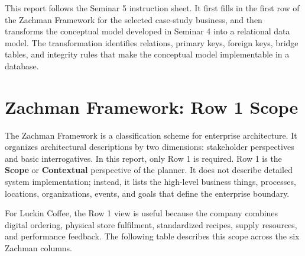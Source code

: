 \documentclass[12pt,a4paper]{article}
\begin{document}
This report follows the Seminar 5 instruction sheet. It first fills in the first row of the Zachman Framework for the selected case-study business, and then transforms the conceptual model developed in Seminar 4 into a relational data model. The transformation identifies relations, primary keys, foreign keys, bridge tables, and integrity rules that make the conceptual model implementable in a database.

\section{Zachman Framework: Row 1 Scope}

The Zachman Framework is a classification scheme for enterprise architecture. It organizes architectural descriptions by two dimensions: stakeholder perspectives and basic interrogatives. In this report, only Row 1 is required. Row 1 is the \textbf{Scope} or \textbf{Contextual} perspective of the planner. It does not describe detailed system implementation; instead, it lists the high-level business things, processes, locations, organizations, events, and goals that define the enterprise boundary.

For Luckin Coffee, the Row 1 view is useful because the company combines digital ordering, physical store fulfilment, standardized recipes, supply resources, and performance feedback. The following table describes this scope across the six Zachman columns.
\end{document}
